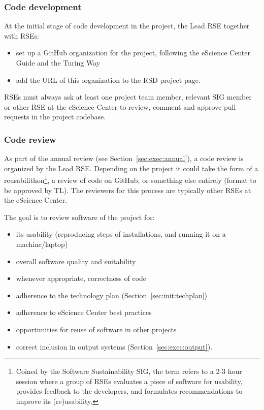 \subsubsection{Code development}
\label{sec:exec:code}
At the initial stage of code development in the project, the Lead RSE together with RSEs:

\begin{itemize}\itemsep0em
\item set up a GitHub organization for the project, following the eScience Center Guide and the Turing Way~\cite{the_turing_way-2023}
\item add the URL of this organization to the RSD project page.
\end{itemize}

RSEs must always ask at least one project team member, relevant SIG member or other RSE at the eScience Center to
review, comment and approve pull requests in the project codebase.

\subsubsection{Code review}
As part of the annual review (see Section~\ref{sec:exec:annual}), a code review is organized by the Lead RSE. Depending
on the project it could take the form of a reusabilithon\footnote{Coined by the Software Sustainability SIG, the term refers to a 2-3 hour session where a group of RSEs evaluates a piece of software for usability, provides feedback to the developers, and formulates recommendations to improve its (re)usability.}, a review of code on GitHub, or
something else entirely (format to be approved by TL). The reviewers for this process are typically other RSEs at the
eScience Center.


The goal is to review software of the project for:
\begin{itemize}\itemsep0em
\item its usability (reproducing steps of installations, and running it on a machine/laptop)
\item overall software quality and suitability
\item whenever appropriate, correctness of code
\item adherence to the technology plan (Section~\ref{sec:init:techplan})
\item adherence to eScience Center best practices
\item opportunities for reuse of software in other projects
\item correct inclusion in output systems (Section~\ref{sec:exec:output}).
\end{itemize}

